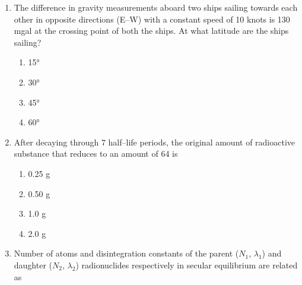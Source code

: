 \documentclass[journal,12pt,onecolumn]{IEEEtran}
\theoremstyle{remark}
\begin{document}
\begin{enumerate}[resume]
\vspace{0.3cm}

\begin{multicols}{2}
\begin{enumerate}
\item P -- 2, Q -- 3, R -- 1, S -- 4  
\item P -- 1, Q -- 3, R -- 2, S -- 4  
\item P -- 4, Q -- 2, R -- 1, S -- 3  
\item P -- 3, Q -- 4, R -- 1, S -- 2  
\end{enumerate}
\end{multicols}
\vspace{0.5cm}






\item The difference in gravity measurements aboard two ships sailing towards each other in opposite directions (E--W) with a constant speed of 10 knots is 130 mgal at the crossing point of both the ships. At what latitude are the ships sailing?

\begin{multicols}{4}
\begin{enumerate}
\item 15°  
\item 30°  
\item 45°  
\item 60°  
\end{enumerate}
\end{multicols}
\vspace{0.5cm}

\item After decaying through 7 half--life periods, the original amount of radioactive substance that reduces to an amount of 64 is

\begin{multicols}{4}
\begin{enumerate}
\item 0.25 g  
\item 0.50 g  
\item 1.0 g  
\item 2.0 g  
\end{enumerate}
\end{multicols}
\vspace{0.5cm}

\item Number of atoms and disintegration constants of the parent ($N_1$, $\lambda_1$) and daughter ($N_2$, $\lambda_2$) radionuclides respectively in secular equilibrium are related as


\end{enumerate}
\end{document}
